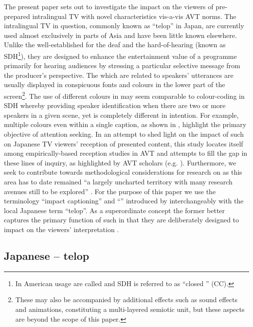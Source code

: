 \documentclass[output=paper]{langsci/langscibook}
\begin{document}
The present paper sets out to investigate the impact on the viewers of pre-prepared intralingual TV  with novel characteristics vis-a-vis AVT norms. The intralingual TV  in question, commonly known as ``telop'' in Japan, are currently used almost exclusively in parts of Asia and have been little known elsewhere.  Unlike the well-established  for the deaf and the hard-of-hearing (known as SDH\footnote{In American usage  are called  and SDH is referred to as ``closed '' (CC).}), they are designed to enhance the entertainment value of a programme primarily for hearing audiences by stressing a particular selective message from the producer's perspective. The  which are related to speakers' utterances are usually displayed in conspicuous fonts and colours in the lower part of the screen\footnote{ These  may also be accompanied by additional effects such as sound effects and animations, constituting a multi-layered semiotic unit, but these aspects are beyond the scope of this paper.}. The use of different colours in  may seem comparable to colour-coding in SDH whereby providing speaker identification when there are two or more speakers in a given scene, yet is completely different in intention. For example, multiple colours even within a single caption, as shown in , highlight the primary objective of attention seeking. In an attempt to shed light on the impact of such  on Japanese TV viewers' reception of presented content, this study locates itself among empirically-based reception studies in AVT and attempts to fill the gap in these lines of inquiry, as highlighted by AVT scholars (e.g. \citealt{gambier2013}). Furthermore, we seek to contribute towards methodological considerations for  research on  as this area has to date remained ``a largely uncharted territory with many research avenues still to be explored'' \citep[n.p.]{Kruger2015}.  For the purpose of this paper we use the terminology ``impact captioning'' and ``'' introduced by \citet{Park2009} interchangeably with the local Japanese term ``telop''. As a superordinate concept the former better captures the primary function of such  in that they are deliberately designed to impact on the viewers' interpretation \citep{Shiota2003}.

\subsection{Japanese  -- telop}
\end{document}
